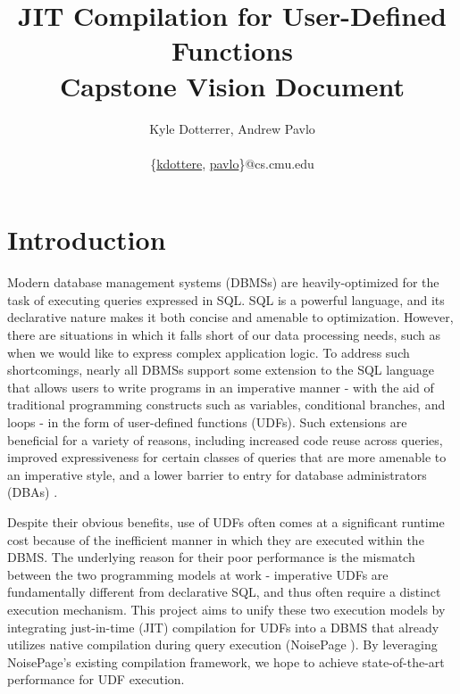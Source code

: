 \documentclass{vldb}
\newcommand{\paperTitle}{JIT Compilation for User-Defined Functions\\ 
    \large Capstone Vision Document}
\begin{document}
\title{\paperTitle}

\author{
    \alignauthor Kyle Dotterrer, Andrew Pavlo\\
    \\
    \email 
        \{\href{mailto:kdottere@cs.cmu.edu}{kdottere},
        \href{mailto:pavlo@cs.cmu.edu}{pavlo}\}@cs.cmu.edu
}

\maketitle


\section*{Introduction}

Modern database management systems (DBMSs) are heavily-optimized for the task of executing queries expressed in SQL. SQL is a powerful language, and its declarative nature makes it both concise and amenable to optimization. However, there are situations in which it falls short of our data processing needs, such as when we would like to express complex application logic. To address such shortcomings, nearly all DBMSs support some extension to the SQL language that allows users to write programs in an imperative manner - with the aid of traditional programming constructs such as variables, conditional branches, and loops - in the form of user-defined functions (UDFs). Such extensions are beneficial for a variety of reasons, including increased code reuse across queries, improved expressiveness for certain classes of queries that are more amenable to an imperative style, and a lower barrier to entry for database administrators (DBAs) \cite{froid}.

Despite their obvious benefits, use of UDFs often comes at a significant runtime cost because of the inefficient manner in which they are executed within the DBMS. The underlying reason for their poor performance is the mismatch between the two programming models at work - imperative UDFs are fundamentally different from declarative SQL, and thus often require a distinct execution mechanism. This project aims to unify these two execution models by integrating just-in-time (JIT) compilation for UDFs into a DBMS that already utilizes native compilation during query execution (NoisePage \cite{noisepage}). By leveraging NoisePage's existing compilation framework, we hope to achieve state-of-the-art performance for UDF execution.
\end{document}

